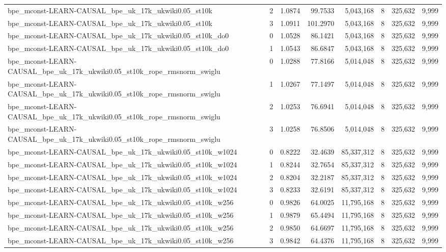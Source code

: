 \begin{tabular}{lrrrrrrr}
bpe\_mconst-LEARN-CAUSAL\_bpe\_uk\_17k\_ukwiki0.05\_st10k & 2 & 1.0874 & 99.7533 & 5,043,168 & 8 & 325,632 & 9,999 \\
bpe\_mconst-LEARN-CAUSAL\_bpe\_uk\_17k\_ukwiki0.05\_st10k & 3 & 1.0911 & 101.2970 & 5,043,168 & 8 & 325,632 & 9,999 \\
bpe\_mconst-LEARN-CAUSAL\_bpe\_uk\_17k\_ukwiki0.05\_st10k\_do0 & 0 & 1.0528 & 86.1421 & 5,043,168 & 8 & 325,632 & 9,999 \\
bpe\_mconst-LEARN-CAUSAL\_bpe\_uk\_17k\_ukwiki0.05\_st10k\_do0 & 1 & 1.0543 & 86.6847 & 5,043,168 & 8 & 325,632 & 9,999 \\
bpe\_mconst-LEARN-CAUSAL\_bpe\_uk\_17k\_ukwiki0.05\_st10k\_rope\_rmsnorm\_swiglu & 0 & 1.0288 & 77.8166 & 5,014,048 & 8 & 325,632 & 9,999 \\
bpe\_mconst-LEARN-CAUSAL\_bpe\_uk\_17k\_ukwiki0.05\_st10k\_rope\_rmsnorm\_swiglu & 1 & 1.0267 & 77.1497 & 5,014,048 & 8 & 325,632 & 9,999 \\
bpe\_mconst-LEARN-CAUSAL\_bpe\_uk\_17k\_ukwiki0.05\_st10k\_rope\_rmsnorm\_swiglu & 2 & 1.0253 & 76.6941 & 5,014,048 & 8 & 325,632 & 9,999 \\
bpe\_mconst-LEARN-CAUSAL\_bpe\_uk\_17k\_ukwiki0.05\_st10k\_rope\_rmsnorm\_swiglu & 3 & 1.0258 & 76.8506 & 5,014,048 & 8 & 325,632 & 9,999 \\
bpe\_mconst-LEARN-CAUSAL\_bpe\_uk\_17k\_ukwiki0.05\_st10k\_w1024 & 0 & 0.8222 & 32.4639 & 85,337,312 & 8 & 325,632 & 9,999 \\
bpe\_mconst-LEARN-CAUSAL\_bpe\_uk\_17k\_ukwiki0.05\_st10k\_w1024 & 1 & 0.8244 & 32.7654 & 85,337,312 & 8 & 325,632 & 9,999 \\
bpe\_mconst-LEARN-CAUSAL\_bpe\_uk\_17k\_ukwiki0.05\_st10k\_w1024 & 2 & 0.8204 & 32.2187 & 85,337,312 & 8 & 325,632 & 9,999 \\
bpe\_mconst-LEARN-CAUSAL\_bpe\_uk\_17k\_ukwiki0.05\_st10k\_w1024 & 3 & 0.8233 & 32.6191 & 85,337,312 & 8 & 325,632 & 9,999 \\
bpe\_mconst-LEARN-CAUSAL\_bpe\_uk\_17k\_ukwiki0.05\_st10k\_w256 & 0 & 0.9826 & 64.0025 & 11,795,168 & 8 & 325,632 & 9,999 \\
bpe\_mconst-LEARN-CAUSAL\_bpe\_uk\_17k\_ukwiki0.05\_st10k\_w256 & 1 & 0.9879 & 65.4494 & 11,795,168 & 8 & 325,632 & 9,999 \\
bpe\_mconst-LEARN-CAUSAL\_bpe\_uk\_17k\_ukwiki0.05\_st10k\_w256 & 2 & 0.9850 & 64.6697 & 11,795,168 & 8 & 325,632 & 9,999 \\
bpe\_mconst-LEARN-CAUSAL\_bpe\_uk\_17k\_ukwiki0.05\_st10k\_w256 & 3 & 0.9842 & 64.4376 & 11,795,168 & 8 & 325,632 & 9,999 \\

\end{tabular}
